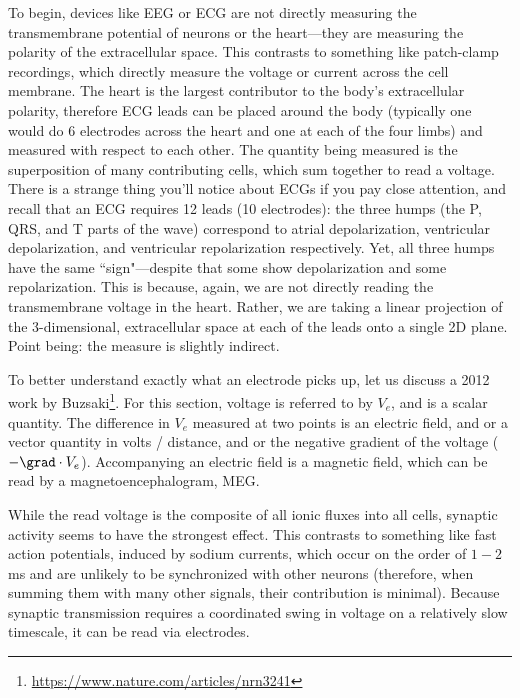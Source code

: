To begin, devices like EEG or ECG are not directly measuring the transmembrane potential of neurons or the heart---they are measuring the polarity of the extracellular space. This contrasts to something like patch-clamp recordings, which directly measure the voltage or current across the cell membrane. The heart is the largest contributor to the body's extracellular polarity, therefore ECG leads can be placed around the body (typically one would do 6 electrodes across the heart and one at each of the four limbs) and measured with respect to each other. The quantity being measured is the superposition of many contributing cells, which sum together to read a voltage. There is a strange thing you'll notice about ECGs if you pay close attention, and recall that an ECG requires 12 leads (10 electrodes): the three humps (the P, QRS, and T parts of the wave) correspond to atrial depolarization, ventricular depolarization, and ventricular repolarization respectively. Yet, all three humps have the same ``sign"---despite that some show depolarization and some repolarization. This is because, again, we are not directly reading the transmembrane voltage in the heart. Rather, we are taking a linear projection of the 3-dimensional, extracellular space at each of the leads onto a single 2D plane. Point being: the measure is slightly indirect. \newline

To better understand exactly what an electrode picks up, let us discuss a 2012 work by Buzsaki\footnote{\url{https://www.nature.com/articles/nrn3241}}. For this section, voltage is referred to by $V_e$, and is a scalar quantity. The difference in $V_e$ measured at two points is an electric field, and or a vector quantity in volts / distance, and or the negative gradient of the voltage ($-\grad \cdot V_e$). Accompanying an electric field is a magnetic field, which can be read by a magnetoencephalogram, MEG.  \newline

While the read voltage is the composite of all ionic fluxes into all cells, synaptic activity seems to have the strongest effect. This contrasts to something like fast action potentials, induced by sodium currents, which occur on the order of $1-2$ms and are unlikely to be synchronized with other neurons (therefore, when summing them with many other signals, their contribution is minimal). Because synaptic transmission requires a coordinated swing in voltage on a relatively slow timescale, it can be read via electrodes.\newline
    
